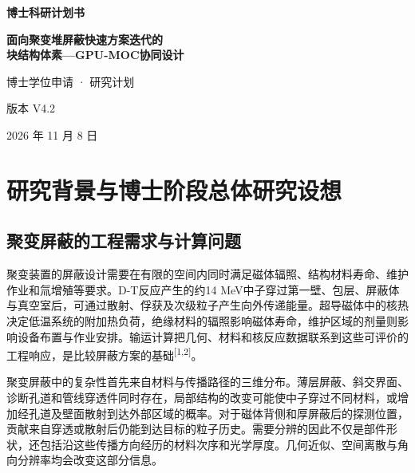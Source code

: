 \documentclass[UTF8, zihao=-4, fontset=none, a4paper]{ctexart}
\newcommand{\upcite}[1]{\textsuperscript{[#1]}}
\begin{document}
\begin{titlepage}
  \centering
  \vspace*{2.4cm}
  {\bfseries 博士科研计划书\par}
  \vspace{1.6cm}
  {\bfseries 面向聚变堆屏蔽快速方案迭代的\\[0.6ex]
   块结构体素—GPU-MOC协同设计\par}
  \vspace{2.4cm}
  { 博士学位申请 · 研究计划\par}
  \vspace{6cm}
  { 版本 V4.2\par}
  \vspace{0.6ex}
  { 2026 年 11 月 8 日\par}
  \vfill
\end{titlepage}

\tableofcontents
\clearpage

\setcounter{page}{1}




\section{研究背景与博士阶段总体研究设想}\label{sec:1}

\subsection{聚变屏蔽的工程需求与计算问题}

聚变装置的屏蔽设计需要在有限的空间内同时满足磁体辐照、结构材料寿命、维护作业和氚增殖等要求。D-T反应产生的约14 MeV中子穿过第一壁、包层、屏蔽体与真空室后，可通过散射、俘获及次级粒子产生向外传递能量。超导磁体中的核热决定低温系统的附加热负荷，绝缘材料的辐照影响磁体寿命，维护区域的剂量则影响设备布置与作业安排。输运计算把几何、材料和核反应数据联系到这些可评价的工程响应，是比较屏蔽方案的基础\upcite{1,2}。

聚变屏蔽中的复杂性首先来自材料与传播路径的三维分布。薄层屏蔽、斜交界面、诊断孔道和管线穿透件同时存在，局部结构的改变可能使中子穿过不同材料，或增加经孔道及壁面散射到达外部区域的概率。对于磁体背侧和厚屏蔽后的探测位置，贡献来自穿透或散射后仍能到达目标的粒子历史。需要分辨的因此不仅是部件形状，还包括沿这些传播方向经历的材料次序和光学厚度。几何近似、空间离散与角向分辨率均会改变这部分信息。
\end{document}
